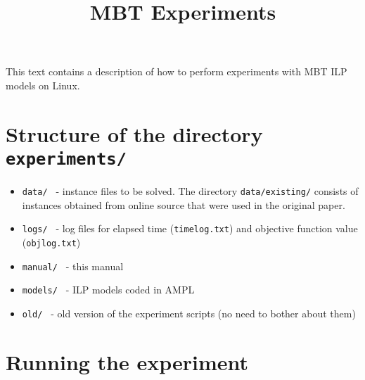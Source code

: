 \documentclass[12pt]{article}
\title{MBT Experiments}
\begin{document}
\maketitle
This text contains a description of how to perform experiments with MBT ILP models on Linux.

\section{Structure of the directory \texttt{experiments/}}
\begin{itemize}
	\item\texttt{data/ } - instance files to be solved. The directory \texttt{data/existing/} consists of instances obtained from online source that were used in the original paper.
	\item\texttt{logs/ } - log files for elapsed time (\texttt{timelog.txt}) and objective function value (\texttt{objlog.txt})
	\item\texttt{manual/ } - this manual
	\item\texttt{models/ } - ILP models coded in AMPL
	\item\texttt{old/ } - old version of the experiment scripts (no need to bother about them)
\end{itemize}

\section{Running the experiment}
\end{document}
